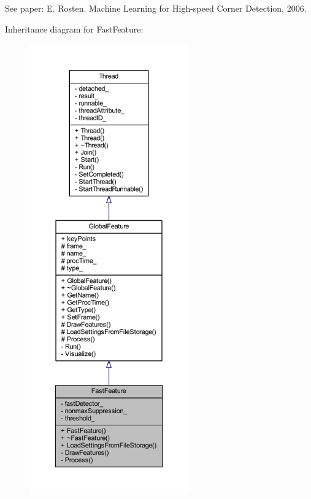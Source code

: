 See paper\-: E. Rosten. Machine Learning for High-\/speed Corner Detection, 2006. 

Inheritance diagram for Fast\-Feature\-:
\nopagebreak
\begin{figure}[H]
\begin{center}
\leavevmode
\includegraphics[height=550pt]{class_fast_feature__inherit__graph}
\end{center}
\end{figure}


